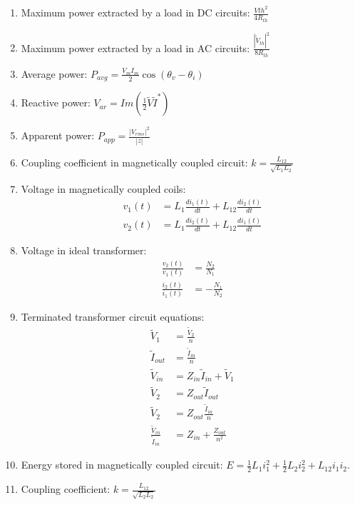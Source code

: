 \documentclass[nobib]{tufte-handout}
\begin{document}
\begin{enumerate}
    \item Maximum power extracted by a load in DC circuits: $\frac{V{th}^2}{4R_{th}}$
    \item Maximum power extracted by a load in AC circuits: $\frac{|\tilde{V}_{th}|^2}{8R_{th}}$
    \item Average power: $P_{avg} = \frac{V_m I_m}{2}\cos{(\theta_v - \theta_i)}$
    \item Reactive power: $V_{ar} = Im(\frac{1}{2}\tilde{V}\tilde{I}^*)$
    \item Apparent power: $P_{app} = \frac{|V_{rms}|^2}{|z|}$
    \item Coupling coefficient in magnetically coupled circuit: $k = \frac{L_{12}}{\sqrt{L_1 L_2}}$
    \item Voltage in magnetically coupled coils: 
    \begin{align*}
        v_{1}(t) &= L_1 \frac{di_1(t)}{dt} + L_{12}\frac{di_2(t)}{dt} \\
        v_{2}(t) &= L_1 \frac{di_2(t)}{dt} + L_{12}\frac{di_1(t)}{dt} 
    \end{align*}
    \item Voltage in ideal transformer: 
    \begin{align*}
        \frac{v_2(t)}{v_1(t)} &= \frac{N_2}{N_1} \\
        \frac{i_2(t)}{i_1(t)} &= -\frac{N_1}{N_2}   
    \end{align*}
    \item Terminated transformer circuit equations: 
    \begin{align*}
        \tilde{V}_1 &= \frac{\tilde{V}_2}{n} \\
        \tilde{I}_{out} &= \frac{\tilde{I}_{in}}{n} \\
        \tilde{V}_{in} &= Z_{in}\tilde{I}_{in} + \tilde{V}_1 \\
        \tilde{V}_2 &= Z_{out}\tilde{I}_{out} \\
        \tilde{V}_2 &= Z_{out}\frac{\tilde{I}_{in}}{n} \\
        \frac{\tilde{V}_{in}}{\tilde{I}_{in}} &= Z_{in} + \frac{Z_{out}}{n^2}
    \end{align*}
    \item Energy stored in magnetically coupled circuit: 
    $E = \frac{1}{2}L_1i_1^2 + \frac{1}{2}L_2i_2^2 + L_{12}i_1i_2$.
    \item Coupling coefficient: $k = \frac{L_{12}}{\sqrt{L_2L_2}}$
\end{enumerate}
\end{document}
